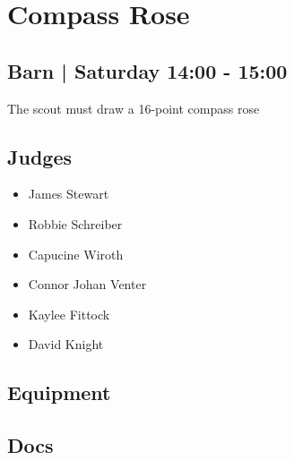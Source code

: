 \documentclass[10pt]{article}
\begin{document}
		\begin{minipage}{\linewidth}
		\setcounter{section}{5}
	\section{Compass Rose }
	\subsection*{Barn | Saturday 14:00 - 15:00}

	The scout must draw a 16-point compass rose

	\begin{multicols}{2}
	\subsection*{\faUsers \: Judges}
	\begin{itemize}
			\item James Stewart
			\item Robbie Schreiber
			\item Capucine Wiroth
			\item Connor Johan Venter
			\item Kaylee Fittock
			\item David Knight
		\end{itemize}
	\columnbreak
	\subsection*{\faWrench \: Equipment}
	        \vfill\null
        \subsection*{\faFile \: Docs}
     	\end{multicols}


	\vspace{1cm}
	\end{minipage}
\end{document}
